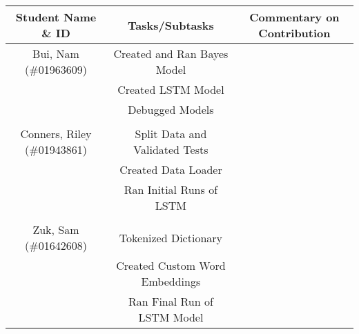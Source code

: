 \documentclass[11pt]{article}
\begin{document}
\begin{table}[H]
    \centering
    \begin{tabular}{c|c|c}
        Student Name \& ID          & Tasks/Subtasks                 & Commentary on Contribution \\
        \hline
        Bui, Nam (\#01963609)       & Created and Ran Bayes Model    &                            \\
                                    & Created LSTM Model             &                            \\
                                    & Debugged Models                &                            \\
                                    &                                &                            \\
        \hline
        Conners, Riley (\#01943861) & Split Data and Validated Tests &                            \\
                                    & Created Data Loader            &                            \\
                                    & Ran Initial Runs of LSTM       &                            \\
                                    &                                &                            \\
        \hline
        Zuk, Sam (\#01642608)       & Tokenized Dictionary           &                            \\
                                    & Created Custom Word Embeddings &                            \\
                                    & Ran Final Run of LSTM Model    &                            \\
    \end{tabular}
    \label{tab:my_label}
\end{table}



\end{document}
